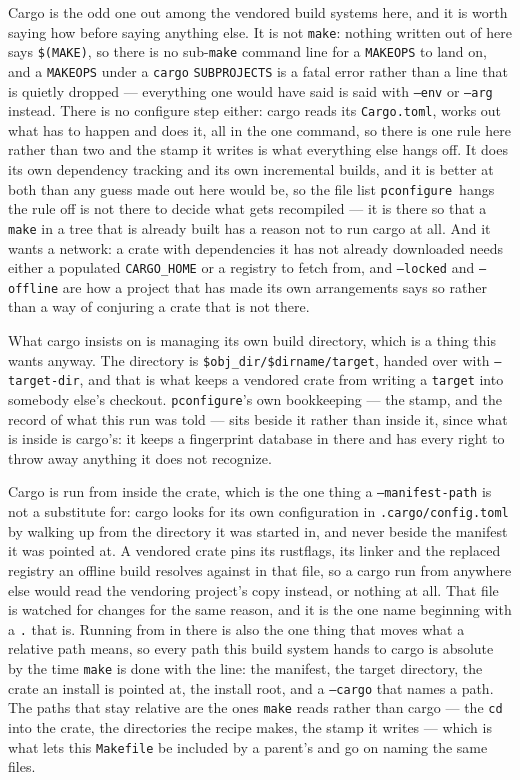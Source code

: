 \documentclass{article}
\newcommand{\pconfigure}{\texttt{pconfigure}}
\begin{document}
Cargo is the odd one out among the vendored build systems here, and it
is worth saying how before saying anything else.  It is not
\texttt{make}: nothing written out of here says \texttt{\$(MAKE)}, so
there is no sub-\texttt{make} command line for a \texttt{MAKEOPS} to
land on, and a \texttt{MAKEOPS} under a \texttt{cargo}
\texttt{SUBPROJECTS} is a fatal error rather than a line that is
quietly dropped --- everything one would have said is said with
\texttt{--env} or \texttt{--arg} instead.  There is no configure step
either: cargo reads its \texttt{Cargo.toml}, works out what has to
happen and does it, all in the one command, so there is one rule here
rather than two and the stamp it writes is what everything else hangs
off.  It does its own dependency tracking and its own incremental
builds, and it is better at both than any guess made out here would
be, so the file list \pconfigure\ hangs the rule off is not there to
decide what gets recompiled --- it is there so that a \texttt{make} in
a tree that is already built has a reason not to run cargo at all.
And it wants a network: a crate with dependencies it has not already
downloaded needs either a populated \texttt{CARGO\_HOME} or a registry
to fetch from, and \texttt{--locked} and \texttt{--offline} are how a
project that has made its own arrangements says so rather than a way
of conjuring a crate that is not there.

What cargo insists on is managing its own build directory, which is a
thing this wants anyway.  The directory is
\texttt{\$obj\_dir/\$dirname/target}, handed over with
\texttt{--target-dir}, and that is what keeps a vendored crate from
writing a \texttt{target} into somebody else's checkout.
\pconfigure's own bookkeeping --- the stamp, and the record of what
this run was told --- sits beside it rather than inside it, since what
is inside is cargo's: it keeps a fingerprint database in there and has
every right to throw away anything it does not recognize.

Cargo is run from inside the crate, which is the one thing a
\texttt{--manifest-path} is not a substitute for: cargo looks for its
own configuration in \texttt{.cargo/config.toml} by walking up from the
directory it was started in, and never beside the manifest it was
pointed at.  A vendored crate pins its rustflags, its linker and the
replaced registry an offline build resolves against in that file, so a
cargo run from anywhere else would read the vendoring project's copy
instead, or nothing at all.  That file is watched for changes for the
same reason, and it is the one name beginning with a \texttt{.} that
is.  Running from in there is also the one thing that moves what a
relative path means, so every path this build system hands to cargo is
absolute by the time \texttt{make} is done with the line: the
manifest, the target directory, the crate an install is pointed at,
the install root, and a \texttt{--cargo} that names a path.  The
paths that stay relative are the ones \texttt{make} reads rather than
cargo --- the \texttt{cd} into the crate, the directories the recipe
makes, the stamp it writes --- which is what lets this
\texttt{Makefile} be included by a parent's and go on naming the same
files.
\end{document}
